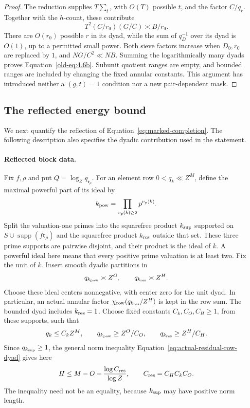 \documentclass[11pt,a4paper]{article}
\numberwithin{equation}{section}
\numberwithin{figure}{section}
\theoremstyle{definition}
\theoremstyle{remark}
\begin{document}
\begin{proof}
The reduction supplies \(T\sum_t\), with \(O(T)\) possible \(t\), and
the factor \(C/q_r\).  Together with the \(h\)-count, these contribute
\[
 T^2(C/r_0)(G/C)\asymp B/r_0.
\]
There are \(O(r_0)\) possible \(r\) in its dyad, while the sum of
\(q_D^{-1}\) over its dyad is \(O(1)\), up to a permitted small power.
Both sieve factors increase when \(D_0,r_0\) are replaced by \(1\), and
\(NG/C^2\ll NB\).  Summing the logarithmically many dyads proves
Equation~\eqref{old-eq:4.6b}.  Subunit quotient ranges are empty, and bounded
ranges are included by changing the fixed annular constants.  This argument
has introduced neither a \((g,t)=1\) condition nor a new pair-dependent mask.
\end{proof}

\subsection{The reflected energy bound}

We next quantify the reflection of Equation~\eqref{eq:marked-completion}.
The following description also specifies the dyadic contribution used in
the statement.

\paragraph{Reflected block data.}\label{par:reflected-energy-data}
Fix \(f,\rho\) and put \(Q=\log_Zq_{\mathfrak r_\rho}\).  For an element
row \(0<q_k\ll Z^M\), define the maximal powerful part of its ideal by
\[
 k_{\rm pow}=\prod_{v_p(k)\ge2}p^{v_p(k)}.
\]
Split the valuation-one primes into the squarefree product
\(k_{\rm sup}\) supported on
\(S\cup\operatorname{supp}(f\mathfrak r_\rho)\) and the squarefree
product \(k_{\rm res}\) outside that set.  These three prime supports
are pairwise disjoint, and their product is the ideal of \(k\).
A powerful ideal here means that every positive prime valuation is at
least two.  Fix the unit of \(k\).  Insert smooth dyadic partitions in
\[
 q_{k_{\rm pow}}\asymp Z^O,\qquad q_{k_{\rm res}}\asymp Z^H.
\]
Choose these ideal centers nonnegative, with center zero for the unit dyad.
In particular, an actual annular factor
\(\chi_{\rm row}(q_{k_{\rm res}}/Z^H)\) is kept in the row sum.  The
bounded dyad includes \(k_{\rm res}=1\).  Choose fixed constants
\(C_k,C_O,C_H\ge1\), from these supports, such that
\[
 q_k\le C_kZ^M,\qquad q_{k_{\rm pow}}\ge Z^O/C_O,\qquad
 q_{k_{\rm res}}\ge Z^H/C_H.
\]
Since \(q_{k_{\rm sup}}\ge1\), the general norm inequality
Equation~\eqref{eq:actual-residual-row-dyad} gives here
\[
 H\le M-O+\frac{\log C_{\rm res}}{\log Z},
 \qquad C_{\rm res}=C_HC_kC_O.
\]
The inequality need not be an equality, because \(k_{\rm sup}\) may
have positive norm length.
\end{document}
